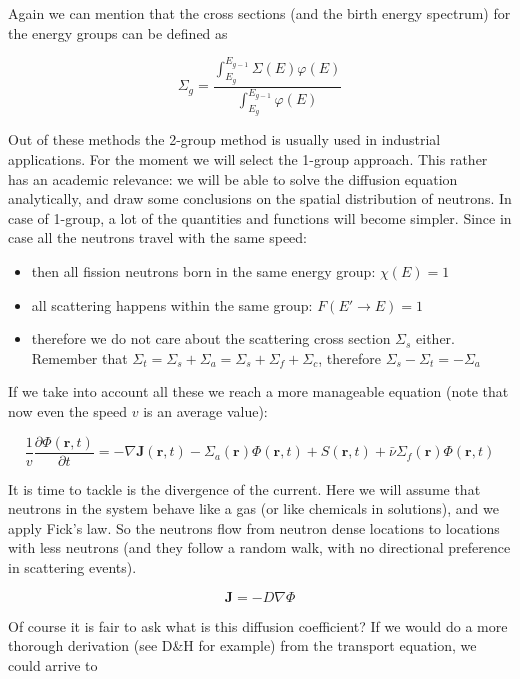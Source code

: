 Again we can mention that the cross sections (and the birth energy spectrum) for the energy groups can be defined as

\begin{equation}
\Sigma_g=\frac{\int_{E_g}^{E_{g-1}}\Sigma(E)\varphi(E)}{\int_{E_g}^{E_{g-1}}\varphi(E)}
\end{equation}
    
Out of these methods the 2-group method is usually used in industrial applications. For the moment we will select the 1-group approach. This rather has an academic relevance: we will be able to solve the diffusion equation analytically, and draw some conclusions on the spatial distribution of neutrons. In case of 1-group, a lot of the quantities and functions will become simpler. Since in case all the neutrons travel with the same speed:

\begin{itemize}
\item then all fission neutrons born in the same energy group: $\chi(E)=1$ 
\item all scattering happens within the same group: $F(E' \rightarrow E)=1$
\item therefore we do not care about the scattering cross section $\Sigma_s$ either. Remember that $\Sigma_t=\Sigma_s+\Sigma_a=\Sigma_s+\Sigma_f+\Sigma_c$, therefore $\Sigma_s-\Sigma_t=-\Sigma_a$
\end{itemize} 

If we take into account all these we reach a more manageable equation (note that now even the speed $v$ is an average value):
    
\begin{equation}
\frac{1}{v}\frac{\partial\Phi(\mathbf{r},t)}{\partial t}=-\nabla \mathbf{J}(\mathbf{r},t)-\Sigma_a(\mathbf{r})\Phi(\mathbf{r},t)+S(\mathbf{r},t) 
+\bar\nu\Sigma_f(\mathbf{r})\Phi(\mathbf{r},t)
\end{equation}


It is time to tackle is the divergence of the current. Here we will assume that neutrons in the system behave like a gas (or like chemicals in solutions), and we apply Fick's law. So the neutrons flow from neutron dense locations to locations with less neutrons (and they follow a random walk, with no directional preference in scattering events).

\begin{equation}
\mathbf{J}=-D\nabla \Phi
\end{equation}

Of course it is fair to ask what is this diffusion coefficient? If we would do a more thorough derivation (see D\&H for example) from the transport equation, we could arrive to

